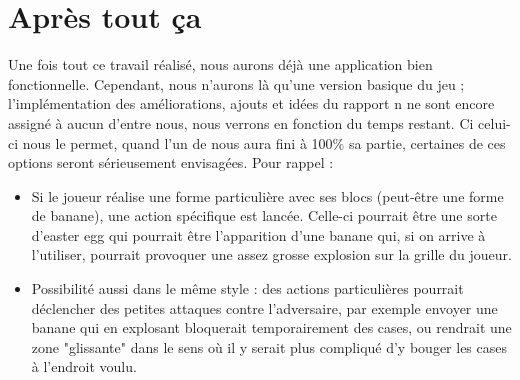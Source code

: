 \documentclass[a4paper,utf8]{article}
\begin{document}
\section{Apr\`es tout \c{c}a}
	Une fois tout ce travail r\'ealis\'e, nous aurons d\'ej\`a une application bien fonctionnelle. Cependant, nous n'aurons l\`a qu'une version basique du jeu ; l'impl\'ementation des am\'eliorations, ajouts et id\'ees du rapport n ne sont encore assign\'e \`a aucun d'entre nous, nous verrons en fonction du temps restant. Ci celui-ci nous le permet, quand l'un de nous aura fini \`a 100\% sa partie, certaines de ces options seront s\'erieusement envisag\'ees. Pour rappel :
	\begin{itemize}
		\item Si le joueur r\'ealise une forme particuli\`ere avec ses blocs (peut-\^{e}tre une forme de banane), une action sp\'ecifique est lanc\'ee. Celle-ci pourrait \^{e}tre une sorte d'easter egg qui pourrait \^{e}tre l'apparition d'une banane qui, si on arrive \`a l'utiliser, pourrait provoquer une assez grosse explosion sur la grille du joueur.
		\item Possibilit\'e aussi dans le m\^{e}me style : des actions particuli\`eres pourrait d\'eclencher des petites attaques contre l'adversaire, par exemple envoyer une banane qui en explosant bloquerait temporairement des cases, ou rendrait une zone "glissante" dans le sens o\`u il y serait plus compliqu\'e d'y bouger les cases \`a l'endroit voulu.
	\end{itemize}
\end{document}
